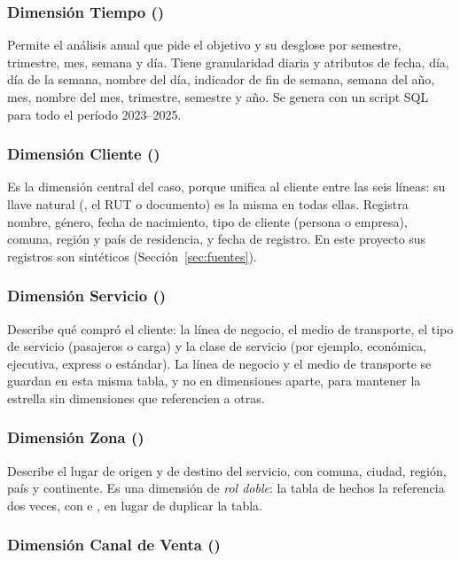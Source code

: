 \subsubsection{Dimensión Tiempo ()}

Permite el análisis anual que pide el objetivo y su desglose por semestre,
trimestre, mes, semana y día. Tiene granularidad diaria y atributos de fecha,
día, día de la semana, nombre del día, indicador de fin de semana, semana del
año, mes, nombre del mes, trimestre, semestre y año. Se genera con un script
SQL para todo el período 2023--2025.

\subsubsection{Dimensión Cliente ()}

Es la dimensión central del caso, porque unifica al cliente entre las seis
líneas: su llave natural (, el RUT o documento) es la misma
en todas ellas. Registra nombre, género, fecha de nacimiento, tipo de cliente
(persona o empresa), comuna, región y país de residencia, y fecha de registro.
En este proyecto sus registros son sintéticos (Sección~\ref{sec:fuentes}).

\subsubsection{Dimensión Servicio ()}

Describe qué compró el cliente: la línea de negocio, el medio de transporte,
el tipo de servicio (pasajeros o carga) y la clase de servicio (por ejemplo,
económica, ejecutiva, express o estándar). La línea de negocio y el medio de transporte se
guardan en esta misma tabla, y no en dimensiones aparte, para mantener la
estrella sin dimensiones que referencien a otras.

\subsubsection{Dimensión Zona ()}

Describe el lugar de origen y de destino del servicio, con comuna, ciudad,
región, país y continente. Es una dimensión de \emph{rol doble}: la tabla de
hechos la referencia dos veces, con  e
, en lugar de duplicar la tabla.

\subsubsection{Dimensión Canal de Venta ()}

